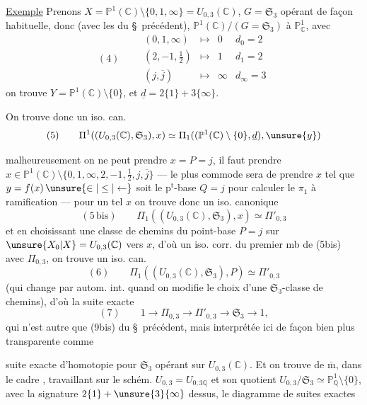 \uline{Exemple} Prenons $X=\mathbb P^1(\mathbb C)\setminus\{0,1,\infty\}=U_{0,3}(\mathbb C)$,
$G=\mathfrak S_3$ opérant de façon habituelle, donc (avec les   du \S\ précédent),
 $\mathbb P^1(\mathbb C)/(G=\mathfrak S_3)$ à $\mathbb P^1_{\mathbb C}$, avec
\[
(4)\qquad
\begin{array}{rcll}
(0,1,\infty)&\longmapsto&0&d_0=2\\
(2,-1,\tfrac12)&\longmapsto&1&d_1=2\\
(j,\overline j)&\longmapsto&\infty&d_\infty=3
\end{array}
\]
on trouve $Y=\mathbb P^1(\mathbb C)\setminus\{0\}$, et $\underline d=2\{1\}+3\{\infty\}$.

On trouve donc un iso. can.
\[
(5)\qquad
\Pi^{1}((U_{0,3}(\mathbb C),\mathfrak S_3),x)
\simeq\Pi_1((\mathbb P^1(\mathbb C)\setminus\{0\},\underline d),\unsure{y})
\]


 malheureusement on ne peut prendre $x=P=j$, il faut prendre
$x\in\mathbb P^1(\mathbb C)\setminus\{0,1,\infty,2,-1,\tfrac12,j,\overline j\}$
--- le plus commode sera de prendre $x$ tel que $y=f(x)\,\unsure{\in|\leq|\leftarrow}$ soit le $\mathrm p^{\mathrm t}$-base  $Q=j$ pour calculer le $\pi_1$ à ramification --- pour un tel $x$ on trouve donc un iso. canonique
\[
(5\,\mathrm{bis})\qquad
\Pi_1((U_{0,3}(\mathbb C),\mathfrak S_3),x)\simeq\Pi'_{0,3}
\]
et en choisissant une classe de chemins du point-base  $P=j$ sur $\unsure{X_0|X}=U_{0,3}(\mathbb C)$ vers $x$, d'où un iso. corr. du premier mb de (5bis)  avec $\Pi_{0,3}$, on trouve un iso. can.
\[
(6)\qquad
\Pi_1((U_{0,3}(\mathbb C),\mathfrak S_3),P)\simeq\Pi'_{0,3}
\]
(qui change par autom. int. quand on modifie le choix d'une $\mathfrak S_3$-classe de chemins), d'où la suite exacte
\[
(7)\qquad
1\longrightarrow\Pi_{0,3}\longrightarrow\Pi'_{0,3}\longrightarrow\mathfrak S_3\longrightarrow 1,
\]
qui n'est autre que (9bis) du \S\ précédent, mais interprétée ici de façon bien plus transparente comme

suite exacte d'homotopie pour $\mathfrak{S}_3$ opérant
sur $U_{0,3}(\mathbb{C})$. Et on trouve de $\overline{\mathrm m}$,
dans le cadre ,
travaillant sur le schém. $U_{0,3}=U_{0,3\mathbb{Q}}$ et son
quotient $U_{0,3}/\mathfrak{S}_3\simeq\mathbb{P}^{1}_{\mathbb{Q}}\setminus\{0\}$, avec
la signature $2\{1\}+\unsure{3}\{\infty\}$ dessus, le
diagramme de suites exactes

